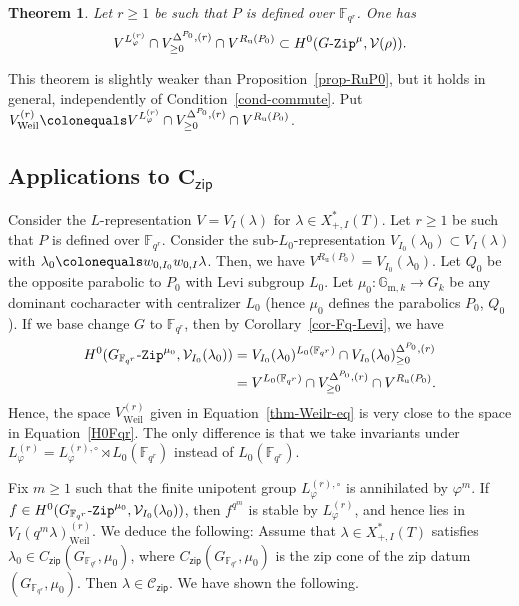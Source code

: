 \documentclass[11pt]{amsart}
\numberwithin{equation}{section}
\newtheorem{theorem}{Theorem}[section]
\theoremstyle{definition}
\theoremstyle{remark}
\newcommand{\GZip}{\mathop{\text{$G$-{\tt Zip}}}\nolimits}
\newcommand{\zipsf}{\mathsf{zip}}
\newcommand{\GFqrZip}{\mathop{\text{$G_{\FF_{q^r}}$-{\tt Zip}}}\nolimits}
\newcommand{\Ccal}{{\mathcal C}}
\newcommand{\Vcal}{{\mathcal V}}
\newcommand{\FF}{\mathbb{F}}
\newcommand{\GG}{\mathbb{G}}
\DeclareMathOperator{\Weil}{Weil}
\begin{document}
\begin{theorem} \label{thm-Weilr}
Let $r\geq 1$ be such that $P$ is defined over $\FF_{q^r}$. One has
\begin{equation} \label{thm-Weilr-eq}
    V^{L_{\varphi}^{(r)}} \cap V^{\Delta^{P_0},(r)}_{\geq 0}\cap V^{R_{\textrm{u}}(P_0)} \subset H^0(\GZip^\mu, \Vcal(\rho)).
\end{equation}
\end{theorem}
This theorem is slightly weaker than Proposition~\ref{prop-RuP0}, but it holds in general, independently of Condition~\ref{cond-commute}. Put $V_{\Weil}^{(r)}\colonequals V^{L_{\varphi}^{(r)}} \cap V^{\Delta^{P_0},(r)}_{\geq 0}\cap V^{R_{\textrm{u}}(P_0)}$.


\subsection{Applications to $\boldsymbol{C_{\zipsf}}$}

Consider the $L$-representation $V=V_I(\lambda)$ for $\lambda\in X_{+,I}^*(T)$. Let $r\geq 1$ be such that $P$ is defined over $\FF_{q^r}$. Consider the sub-$L_0$-representation $V_{I_0}(\lambda_0)\subset V_I(\lambda)$ with $\lambda_0\colonequals w_{0,I_0}w_{0,I}\lambda$. Then, we have $V^{R_{\textrm{u}}(P_0)}=V_{I_0}(\lambda_0)$. Let $Q_0$ be the opposite parabolic to $P_0$ with Levi subgroup $L_0$. Let $\mu_0\colon \GG_{\textrm{m},k}\to G_k$ be any dominant cocharacter with centralizer $L_0$ (hence $\mu_0$ defines the parabolics $P_0$, $Q_0$). If we base change $G$ to $\FF_{q^r}$, then by Corollary~\ref{cor-Fq-Levi}, we have 
\begin{align}
    H^0(\GFqrZip^{\mu_0},\Vcal_{I_0}(\lambda_0)) &= V_{I_0}(\lambda_0)^{L_0(\FF_{q^r})}\cap V_{I_0}(\lambda_0)^{\Delta^{P_0},(r)}_{\geq 0} \\ &=V^{L_0(\FF_{q^r})} \cap V^{\Delta^{P_0},(r)}_{\geq 0}\cap V^{R_{\textrm{u}}(P_0)}. \label{H0Fqr}
\end{align}
Hence, the space $V_{\Weil}^{(r)}$ given in Equation~\eqref{thm-Weilr-eq} is very close to the space in Equation~\eqref{H0Fqr}. The only difference is that we take invariants under $L_{\varphi}^{(r)} = L_{\varphi}^{(r),\circ}\rtimes L_0(\FF_{q^r})$ instead of $L_0(\FF_{q^r})$.

Fix $m\geq 1$ such that the finite unipotent group $L_{\varphi}^{(r),\circ}$ is annihilated by $\varphi^m$. 
If $f\in H^0(\GFqrZip^{\mu_0},\Vcal_{I_0}(\lambda_0))$, then $f^{q^m}$ is stable by $L_{\varphi}^{(r)}$, and hence lies in $V_I(q^m\lambda)_{\Weil}^{(r)}$. 
We deduce the following: Assume that $\lambda\in X_{+,I}^*(T)$ satisfies $\lambda_0\in C_{\zipsf}(G_{\FF_{q^r}},\mu_0)$, where $C_{\zipsf}(G_{\FF_{q^r}},\mu_0)$ is the zip cone of the zip datum $(G_{\FF_{q^r}},\mu_0)$. Then $\lambda\in \Ccal_{\zipsf}$. We have shown the following.
\end{document}
